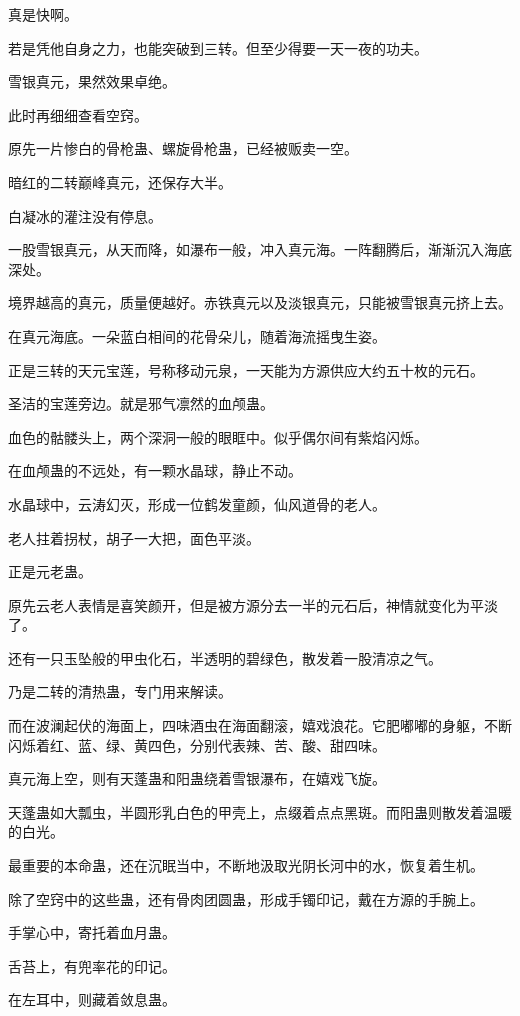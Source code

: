 \begin{this_body}
真是快啊。

若是凭他自身之力，也能突破到三转。但至少得要一天一夜的功夫。

雪银真元，果然效果卓绝。

此时再细细查看空窍。

原先一片惨白的骨枪蛊、螺旋骨枪蛊，已经被贩卖一空。

暗红的二转巅峰真元，还保存大半。

白凝冰的灌注没有停息。

一股雪银真元，从天而降，如瀑布一般，冲入真元海。一阵翻腾后，渐渐沉入海底深处。

境界越高的真元，质量便越好。赤铁真元以及淡银真元，只能被雪银真元挤上去。

在真元海底。一朵蓝白相间的花骨朵儿，随着海流摇曳生姿。

正是三转的天元宝莲，号称移动元泉，一天能为方源供应大约五十枚的元石。

圣洁的宝莲旁边。就是邪气凛然的血颅蛊。

血色的骷髅头上，两个深洞一般的眼眶中。似乎偶尔间有紫焰闪烁。

在血颅蛊的不远处，有一颗水晶球，静止不动。

水晶球中，云涛幻灭，形成一位鹤发童颜，仙风道骨的老人。

老人拄着拐杖，胡子一大把，面色平淡。

正是元老蛊。

原先云老人表情是喜笑颜开，但是被方源分去一半的元石后，神情就变化为平淡了。

还有一只玉坠般的甲虫化石，半透明的碧绿色，散发着一股清凉之气。

乃是二转的清热蛊，专门用来解读。

而在波澜起伏的海面上，四味酒虫在海面翻滚，嬉戏浪花。它肥嘟嘟的身躯，不断闪烁着红、蓝、绿、黄四色，分别代表辣、苦、酸、甜四味。

真元海上空，则有天蓬蛊和阳蛊绕着雪银瀑布，在嬉戏飞旋。

天蓬蛊如大瓢虫，半圆形乳白色的甲壳上，点缀着点点黑斑。而阳蛊则散发着温暖的白光。

最重要的本命蛊，还在沉眠当中，不断地汲取光阴长河中的水，恢复着生机。

除了空窍中的这些蛊，还有骨肉团圆蛊，形成手镯印记，戴在方源的手腕上。

手掌心中，寄托着血月蛊。

舌苔上，有兜率花的印记。

在左耳中，则藏着敛息蛊。


\end{this_body}
